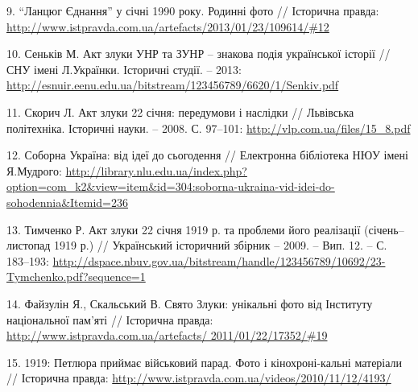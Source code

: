 9. \enquote{Ланцюг Єднання} у січні 1990 року. Родинні фото // Історична правда:
\url{http://www.istpravda.com.ua/artefacts/2013/01/23/109614/#12}

10. Сеньків М. Акт злуки УНР та ЗУНР – знакова подія української історії // СНУ
імені Л.Українки. Історичні студії. – 2013:
\url{http://esnuir.eenu.edu.ua/bitstream/123456789/6620/1/Senkiv.pdf}

11. Скорич Л. Акт злуки 22 січня: передумови і наслідки // Львівська
політехніка. Історичні науки. – 2008. С. 97–101:
\url{http://vlp.com.ua/files/15_8.pdf}

12. Соборна Україна: від ідеї до сьогодення // Електронна бібліотека НЮУ імені
Я.Мудрого: \url{http://library.nlu.edu.ua/index.php?option=com_k2&view=item&id=304:soborna-ukraina-vid-idei-do-sohodennia&Itemid=236}

13. Тимченко Р. Акт злуки 22 січня 1919 р. та проблеми його реалізації
(січень–листопад 1919 р.) // Український історичний збірник – 2009. – Вип. 12.
– С. 183–193:
\url{http://dspace.nbuv.gov.ua/bitstream/handle/123456789/10692/23-Tymchenko.pdf?sequence=1}

14. Файзулін Я., Скальський В. Свято Злуки: унікальні фото від Інституту
національної пам'яті // Історична правда:
\url{http://www.istpravda.com.ua/artefacts/ 2011/01/22/17352/#19}

15. 1919: Петлюра приймає військовий парад. Фото і кінохроні\hyp{}кальні матеріали //
Історична правда: \url{http://www.istpravda.com.ua/videos/2010/11/12/4193/}
